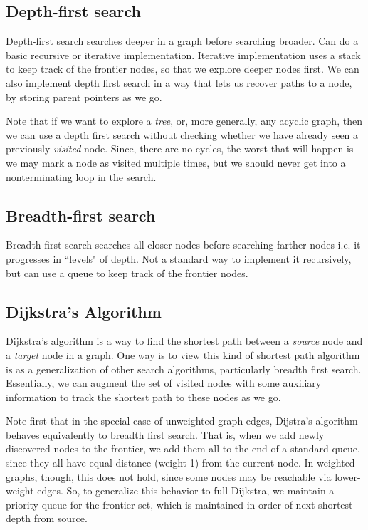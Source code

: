 \documentclass[10pt,a4paper]{article}
\begin{document}
\subsection{Depth-first search}
Depth-first search searches deeper in a graph before searching broader. Can do a basic recursive or iterative implementation. Iterative implementation uses a stack to keep track of the frontier nodes, so that we explore deeper nodes first. We can also implement depth first search in a way that lets us recover paths to a node, by storing parent pointers as we go.

Note that if we want to explore a \textit{tree}, or, more generally, any acyclic graph, then we can use a depth first search without checking whether we have already seen a previously \textit{visited} node. Since, there are no cycles, the worst that will happen is we may mark a node as visited multiple times, but we should never get into a nonterminating loop in the search.

\subsection{Breadth-first search}
Breadth-first search searches all closer nodes before searching farther nodes i.e. it progresses in ``levels" of depth. Not a standard way to implement it recursively, but can use a queue to keep track of the frontier nodes.

\subsection{Dijkstra's Algorithm}

Dijkstra's algorithm is a way to find the shortest path between a \textit{source} node and a \textit{target} node in a graph. One way is to view this kind of shortest path algorithm is as a generalization of other search algorithms, particularly breadth first search. Essentially, we can augment the set of visited nodes with some auxiliary information to track the shortest path to these nodes as we go. 

Note first that in the special case of unweighted graph edges, Dijstra's algorithm behaves equivalently to breadth first search. That is, when we add newly discovered nodes to the frontier, we add them all to the end of a standard queue, since they all have equal distance (weight 1) from the current node. In weighted graphs, though, this does not hold, since some nodes may be reachable via lower-weight edges. So, to generalize this behavior to full Dijkstra, we maintain a priority queue for the frontier set, which is maintained in order of next shortest depth from source.
\end{document}
